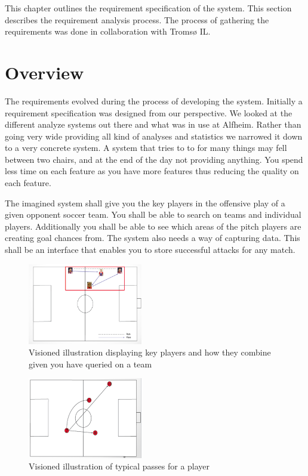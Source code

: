 This chapter outlines the requirement specification of the system. This section describes the requirement analysis process. The process of gathering the requirements was done in collaboration with Tromsø IL.

\section{Overview}

The requirements evolved during the process of developing the system. Initially a requirement specification was designed from our perspective. We looked at the different analyze systems out there and what was in use at Alfheim. Rather than going very wide providing all kind of analyses and statistics we narrowed it down to a very concrete system. A system that tries to to for many things may fell between two chairs, and at the end of the day not providing anything. You spend less time on each feature as you have more features thus reducing the quality on each feature.

The imagined system shall give you the key players in the offensive play of a given opponent soccer team. You shall be able to search on teams and individual players. Additionally you shall be able to see which areas of the pitch players are creating goal chances from. The system also needs a way of capturing data. This shall be an interface that enables you to store successful attacks for any match.

\begin{figure}[ht!]
\centering
\includegraphics[width=50mm]{images/general/illustration_after_search.png}
\caption{Visioned illustration displaying key players and how they combine given you have queried on a team}
\label{overflow}
\end{figure}

\begin{figure}[ht!]
\centering
\includegraphics[width=50mm]{images/general/illustration_after_search2.png}
\caption{Visioned illustration of typical passes for a player}
\label{overflow}
\end{figure}

